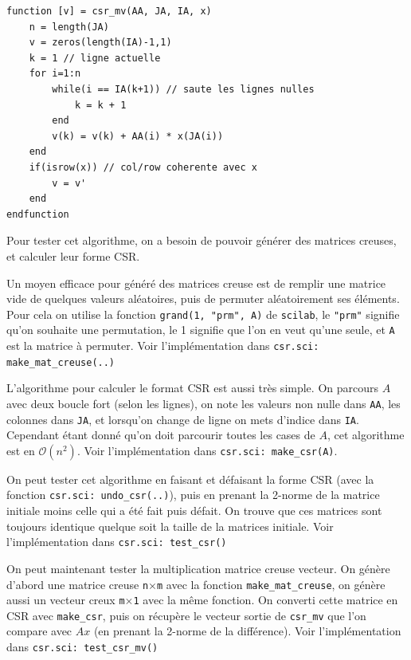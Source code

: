 \documentclass{article}
\begin{document}
\begin{scriptsize}
\centering
\begin{verbatim}
function [v] = csr_mv(AA, JA, IA, x)
    n = length(JA)
    v = zeros(length(IA)-1,1)
    k = 1 // ligne actuelle
    for i=1:n
        while(i == IA(k+1)) // saute les lignes nulles
            k = k + 1
        end
        v(k) = v(k) + AA(i) * x(JA(i))
    end
    if(isrow(x)) // col/row coherente avec x
        v = v'
    end
endfunction
\end{verbatim}
\end{scriptsize}

Pour tester cet algorithme, on a besoin de pouvoir générer des matrices creuses, et calculer leur forme CSR.

Un moyen efficace pour généré des matrices creuse est de remplir une matrice vide de quelques valeurs aléatoires, puis de permuter aléatoirement ses éléments. Pour cela on utilise la fonction \texttt{grand(1, "prm", A)} de \texttt{scilab}, le \texttt{"prm"} signifie qu'on souhaite une permutation, le 1 signifie que l'on en veut qu'une seule, et \texttt{A} est la matrice à permuter. Voir l'implémentation dans \texttt{csr.sci: make\_mat\_creuse(..)}
\newline\indent

L'algorithme pour calculer le format CSR est aussi très simple. On parcours \(A\) avec deux boucle fort (selon les lignes), on note les valeurs non nulle dans \texttt{AA}, les colonnes dans \texttt{JA}, et lorsqu'on change de ligne on mets d'indice dans \texttt{IA}. Cependant étant donné qu'on doit parcourir toutes les cases de \(A\), cet algorithme est en \(\mathcal{O}(n^2)\). Voir l'implémentation dans \texttt{csr.sci: make\_csr(A)}.

On peut tester cet algorithme en faisant et défaisant la forme CSR (avec la fonction \texttt{csr.sci: undo\_csr(..)}), puis en prenant la 2-norme de la matrice initiale moins celle qui a été fait puis défait. On trouve que ces matrices sont toujours identique quelque soit la taille de la matrices initiale. Voir l'implémentation dans \texttt{csr.sci: test\_csr()}
\newline\indent

On peut maintenant tester la multiplication matrice creuse vecteur. On génère d'abord une matrice creuse \texttt{n}\(\times\)\texttt{m} avec la fonction \texttt{make\_mat\_creuse}, on génère aussi un vecteur creux \texttt{m}\(\times\)\texttt{1} avec la même fonction. On converti cette matrice en CSR avec \texttt{make\_csr}, puis on récupère le vecteur sortie de \texttt{csr\_mv} que l'on compare avec \(Ax\) (en prenant la 2-norme de la différence). Voir l'implémentation dans \texttt{csr.sci: test\_csr\_mv()}
\end{document}
